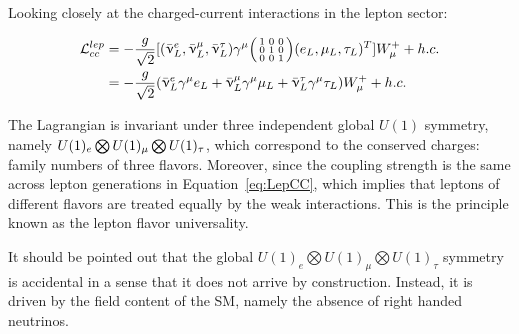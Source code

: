 Looking closely at the charged-current interactions in the lepton sector:

\begin{equation}
\label{eq:LepCC}
\begin{split}
\mathcal{L}_{cc}^{lep}&=-\frac{g}{\sqrt{2}}[(\bar{\upnu}_{L}^{e},\bar{\upnu}_{L}^{\mu},\bar{\upnu}^{\tau}_{L})\gamma^{\mu}\begin{psmallmatrix}1&0&0\\0&1&0\\0&0&1\end{psmallmatrix}(e_{L},\mu_{L},\tau_{L})^{T}]W_{\mu}^{+} + h.c.\\
&=-\frac{g}{\sqrt{2}}(\bar{\upnu}_{L}^{e}\gamma^{\mu}e_{L}+\bar{\upnu}_{L}^{\mu}\gamma^{\mu}\mu_{L}+\bar{\upnu}_{L}^{\tau}\gamma^{\mu}\tau_{L})W^{+}_{\mu} + h.c.
\end{split}
\end{equation}

The Lagrangian is invariant under three independent global $U(1)$ symmetry, namely $U(1)_{e}\bigotimes\\U(1)_{\mu}\bigotimes U(1)_{\tau}$, which correspond to the conserved charges: family numbers of three flavors. Moreover, since the coupling strength is the same across lepton generations in Equation~\ref{eq:LepCC}, which implies that leptons of different flavors are treated equally by the weak interactions. This is the principle known as the lepton flavor universality.

It should be pointed out that the global $U(1)_{e}\bigotimes U(1)_{\mu}\bigotimes U(1)_{\tau}$ symmetry is accidental in a sense that it does not arrive by construction. Instead, it is driven by the field content of the \ac{SM}, namely the absence of right handed neutrinos. 